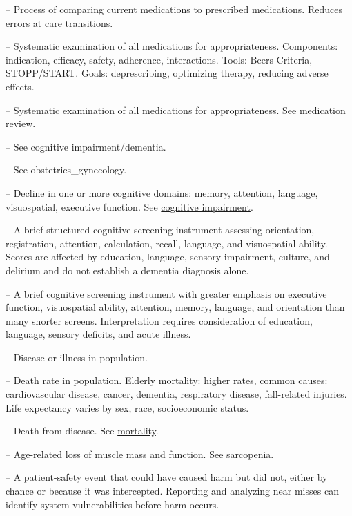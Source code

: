 -- Process of comparing current medications to prescribed medications. Reduces errors at care transitions.

-- Systematic examination of all medications for appropriateness. Components: indication, efficacy, safety, adherence, interactions. Tools: Beers Criteria, STOPP/START. Goals: deprescribing, optimizing therapy, reducing adverse effects.

-- Systematic examination of all medications for appropriateness. See \hyperlink{Medication Review}{medication review}.

-- See cognitive impairment/dementia.

-- See obstetrics\_gynecology.

-- Decline in one or more cognitive domains: memory, attention, language, visuospatial, executive function. See \hyperlink{Cognitive Impairment}{cognitive impairment}.

-- A brief structured cognitive screening instrument assessing orientation, registration, attention, calculation, recall, language, and visuospatial ability. Scores are affected by education, language, sensory impairment, culture, and delirium and do not establish a dementia diagnosis alone.

-- A brief cognitive screening instrument with greater emphasis on executive function, visuospatial ability, attention, memory, language, and orientation than many shorter screens. Interpretation requires consideration of education, language, sensory deficits, and acute illness.

-- Disease or illness in population.

-- Death rate in population. Elderly mortality: higher rates, common causes: cardiovascular disease, cancer, dementia, respiratory disease, fall-related injuries. Life expectancy varies by sex, race, socioeconomic status.

-- Death from disease. See \hyperlink{Mortality}{mortality}.


-- Age-related loss of muscle mass and function. See \hyperlink{Sarcopenia}{sarcopenia}.

-- A patient-safety event that could have caused harm but did not, either by chance or because it was intercepted. Reporting and analyzing near misses can identify system vulnerabilities before harm occurs.

